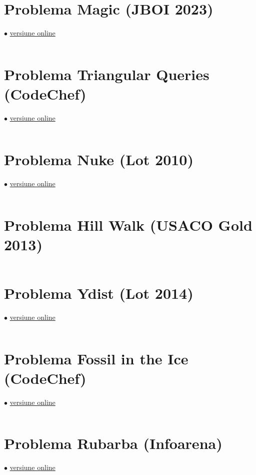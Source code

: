 \documentclass[../main.tex]{subfiles}
\begin{document}
\section{Problema Magic (JBOI 2023)}
\label{code:magic}
$\bullet$
\href{https://kilonova.ro/submissions/679848}{versiune online}

\inputminted{cpp}{../src/geometry/magic.cpp}

\section{Problema Triangular Queries (CodeChef)}
\label{code:triangular-queries}
$\bullet$
\href{https://www.codechef.com/viewsolution/1051479129}{versiune online}

\inputminted{cpp}{../src/geometry/triangular-queries.cpp}

\section{Problema Nuke (Lot 2010)}
\label{code:nuke}
$\bullet$
\href{https://kilonova.ro/submissions/968556}{versiune online}

\inputminted{cpp}{../src/geometry/nuke.cpp}

\section{Problema Hill Walk (USACO Gold 2013)}
\label{code:hill-walk}

\inputminted{cpp}{../src/geometry/hill-walk.cpp}

\section{Problema Ydist (Lot 2014)}
\label{code:ydist}
$\bullet$
\href{https://kilonova.ro/submissions/687912}{versiune online}

\inputminted{cpp}{../src/geometry/ydist.cpp}

\section{Problema Fossil in the Ice (CodeChef)}
\label{code:fossil-in-the-ice}
$\bullet$
\href{https://www.codechef.com/viewsolution/1051660342}{versiune online}

\inputminted{cpp}{../src/geometry/fossil-in-the-ice.cpp}

\section{Problema Rubarba (Infoarena)}
\label{code:rubarba}
$\bullet$
\href{https://infoarena.ro/job_detail/3216732?action=view-source}{versiune online}

\inputminted{cpp}{../src/geometry/rubarba.cpp}
\end{document}
